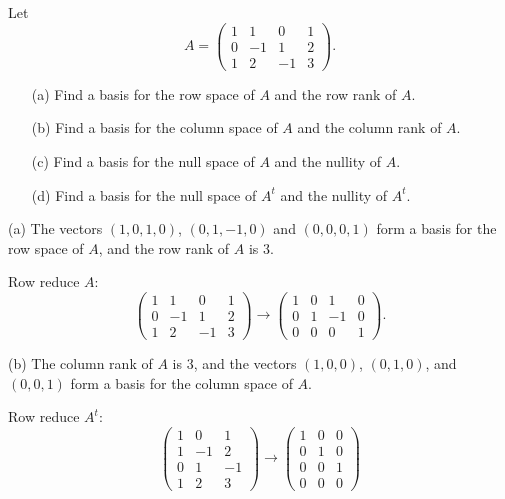 \documentclass{ximera}
\begin{document}
\begin{exercise} \label{c5.8.3}
Let
\[
A = \left(\begin{array}{rrrr} 1 & 1 & 0 & 1\\ 0 & -1 & 1 & 2\\
1 & 2 & -1 & 3 \end{array}\right).
\]
\begin{itemize}
\item[(a)]  Find a basis for the row space of $A$ and the row rank of $A$.
\item[(b)]  Find a basis for the column space of $A$ and the column rank of
$A$.
\item[(c)]  Find a basis for the null space of $A$ and the nullity of $A$.
\item[(d)]  Find a basis for the null space of $A^t$ and the nullity of $A^t$.
\end{itemize}

\begin{solution}

(a) \ans The vectors $(1,0,1,0)$, $(0,1,-1,0)$ and $(0,0,0,1)$ form a
basis for the row space of $A$, and the row rank of $A$ is $3$.

\soln Row reduce $A$:
\[
\left(\begin{array}{rrrr} 1 & 1 & 0 & 1 \\ 0 & -1 & 1 & 2 \\1 & 2
& -1 & 3 \end{array}\right) \longrightarrow \left(\begin{array}{rrrr}
1 & 0 & 1 & 0 \\ 0 & 1 & -1 & 0 \\0 & 0 & 0 & 1 \end{array}\right).
\]

(b) \ans The column rank of $A$ is $3$, and the vectors $(1,0,0)$,
$(0,1,0)$, and $(0,0,1)$ form a basis for the column space of $A$.

\soln Row reduce $A^t$:
\[
\left(\begin{array}{rrr} 1 & 0 & 1 \\ 1 & -1 & 2 \\ 0 & 1 & -1
\\ 1 & 2 & 3 \end{array}\right) \longrightarrow \left(\begin{array}{rrr}
1 & 0 & 0 \\ 0 & 1 & 0 \\ 0 & 0 & 1 \\ 0 & 0 & 0 \end{array}\right)
\]


\end{solution}
\end{exercise}
\end{document}
